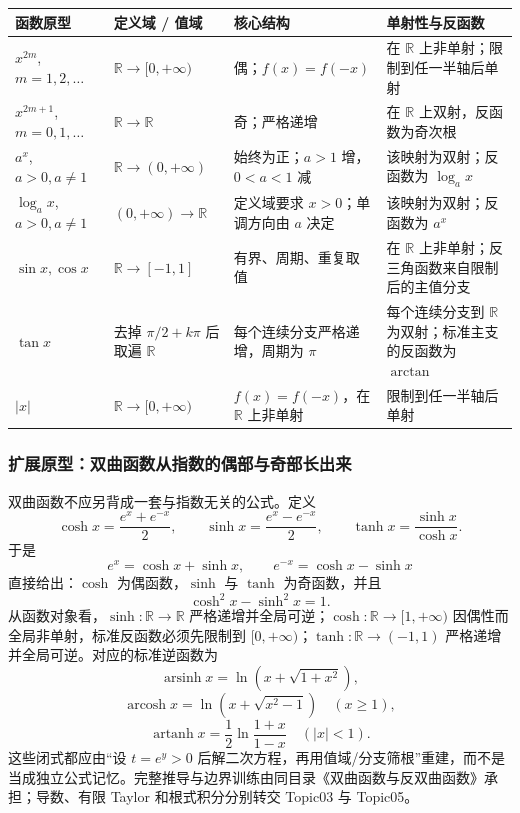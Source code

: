 \documentclass[11pt,a4paper]{ctexart}
\begin{document}
\begin{center}
\begin{tabularx}{\linewidth}{L{2.7cm}L{3.2cm}L{3.7cm}Y}
\toprule
函数原型 & 定义域 / 值域 & 核心结构 & 单射性与反函数 \\
\midrule
\(x^{2m}\), \(m=1,2,\ldots\) & \(\mathbb R\to[0,+\infty)\) & 偶；\(f(x)=f(-x)\) & 在 \(\mathbb R\) 上非单射；限制到任一半轴后单射 \\
\(x^{2m+1}\), \(m=0,1,\ldots\) & \(\mathbb R\to\mathbb R\) & 奇；严格递增 & 在 \(\mathbb R\) 上双射，反函数为奇次根 \\
\(a^x\), \(a>0,a\ne1\) & \(\mathbb R\to(0,+\infty)\) & 始终为正；\(a>1\) 增，\(0<a<1\) 减 & 该映射为双射；反函数为 \(\log_a x\) \\
\(\log_a x\), \(a>0,a\ne1\) & \((0,+\infty)\to\mathbb R\) & 定义域要求 \(x>0\)；单调方向由 \(a\) 决定 & 该映射为双射；反函数为 \(a^x\) \\
\(\sin x,\cos x\) & \(\mathbb R\to[-1,1]\) & 有界、周期、重复取值 & 在 \(\mathbb R\) 上非单射；反三角函数来自限制后的主值分支 \\
\(\tan x\) & 去掉 \(\pi/2+k\pi\) 后取遍 \(\mathbb R\) & 每个连续分支严格递增，周期为 \(\pi\) & 每个连续分支到 \(\mathbb R\) 为双射；标准主支的反函数为 \(\arctan\) \\
\(\lvert x\rvert\) & \(\mathbb R\to[0,+\infty)\) & \(f(x)=f(-x)\)，在 \(\mathbb R\) 上非单射 & 限制到任一半轴后单射 \\
\bottomrule
\end{tabularx}
\end{center}

\subsubsection{扩展原型：双曲函数从指数的偶部与奇部长出来}

双曲函数不应另背成一套与指数无关的公式。定义
\[
\cosh x=\frac{e^x+e^{-x}}2,
\qquad
\sinh x=\frac{e^x-e^{-x}}2,
\qquad
\tanh x=\frac{\sinh x}{\cosh x}.
\]
于是
\[
\boxed{e^x=\cosh x+\sinh x,\qquad e^{-x}=\cosh x-\sinh x}
\]
直接给出：$\cosh$ 为偶函数，$\sinh$ 与 $\tanh$ 为奇函数，并且
\[
\boxed{\cosh^2x-\sinh^2x=1}.
\]
从函数对象看，$\sinh:\mathbb R\to\mathbb R$ 严格递增并全局可逆；$\cosh:\mathbb R\to[1,+\infty)$ 因偶性而全局非单射，标准反函数必须先限制到 $[0,+\infty)$；$\tanh:\mathbb R\to(-1,1)$ 严格递增并全局可逆。对应的标准逆函数为
\[
\operatorname{arsinh}x=\ln\left(x+\sqrt{1+x^2}\right),
\]
\[
\operatorname{arcosh}x=\ln\left(x+\sqrt{x^2-1}\right)\quad(x\ge1),
\]
\[
\operatorname{artanh}x=\frac12\ln\frac{1+x}{1-x}\quad(\lvert x\rvert<1).
\]
这些闭式都应由“设 $t=e^y>0$ 后解二次方程，再用值域/分支筛根”重建，而不是当成独立公式记忆。完整推导与边界训练由同目录《双曲函数与反双曲函数》承担；导数、有限 Taylor 和根式积分分别转交 Topic03 与 Topic05。
\end{document}
